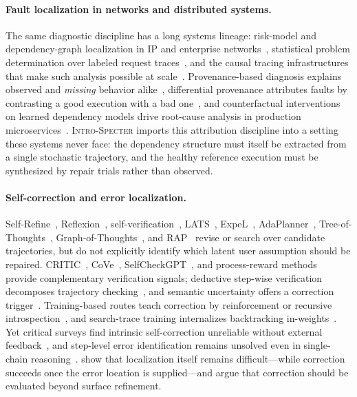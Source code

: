 \documentclass{article}
\newcommand{\method}{\textsc{Intro-Specter}\xspace}
\begin{document}
\paragraph{Fault localization in networks and distributed systems.}
The same diagnostic discipline has a long systems lineage: risk-model and dependency-graph localization in IP and enterprise networks~\citep{kompella2005score,kandula2005shrink,bahl2007sherlock,kandula2009netmedic}, statistical problem determination over labeled request traces~\citep{chen2002pinpoint}, and the causal tracing infrastructures that make such analysis possible at scale~\citep{fonseca2007xtrace,sigelman2010dapper,kaldor2017canopy}. Provenance-based diagnosis explains observed and \emph{missing} behavior alike~\citep{wu2014negative,wu2019zeno}, differential provenance attributes faults by contrasting a good execution with a bad one~\citep{chen2016diffprov}, and counterfactual interventions on learned dependency models drive root-cause analysis in production microservices~\citep{gan2021sage}. \method imports this attribution discipline into a setting these systems never face: the dependency structure must itself be extracted from a single stochastic trajectory, and the healthy reference execution must be synthesized by repair trials rather than observed.

\paragraph{Self-correction and error localization.}
Self-Refine~\citep{madaan2023selfrefine}, Reflexion~\citep{shinn2023reflexion}, self-verification~\citep{weng2023selfverif}, LATS~\citep{zhou2024lats}, ExpeL~\citep{zhao2024expel}, AdaPlanner~\citep{sun2023adaplanner}, Tree-of-Thoughts~\citep{yao2023tot}, Graph-of-Thoughts~\citep{besta2024got}, and RAP~\citep{hao2023rap} revise or search over candidate trajectories, but do not explicitly identify which latent user assumption should be repaired. CRITIC~\citep{gou2024critic}, CoVe~\citep{dhuliawala2024cove}, SelfCheckGPT~\citep{manakul2023selfcheckgpt}, and process-reward methods~\citep{lightman2023verify,wang2023mathshepherd} provide complementary verification signals; deductive step-wise verification decomposes trajectory checking~\citep{ling2023deductive}, and semantic uncertainty offers a correction trigger~\citep{kuhn2023semantic}. Training-based routes teach correction by reinforcement or recursive introspection~\citep{kumar2024score,qu2024rise}, and search-trace training internalizes backtracking in-weights~\citep{gandhi2024sos}. Yet critical surveys find intrinsic self-correction unreliable without external feedback~\citep{kamoi2024critical}, and step-level error identification remains unsolved even in single-chain reasoning~\citep{zheng2025processbench}. \citet{tyen2024llmerrors} show that localization itself remains difficult---while correction succeeds once the error location is supplied---and \citet{he2025selfcorrect} argue that correction should be evaluated beyond surface refinement.
\end{document}
